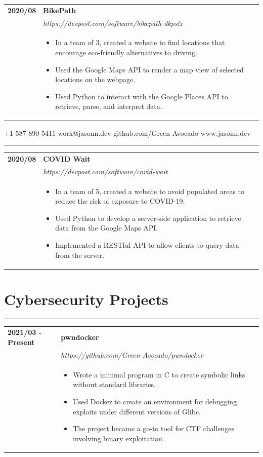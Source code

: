 \documentclass[letterpaper]{article}
\makeatletter
\newcommand{\sect}[1]{\section*{#1}
                        {\color{cyan}
                        \rule{\textwidth}{1pt}
                        \vspace{-1ex}}}
\newcommand{\secondpage}{\pagebreak
                            {\small
                                +1 587-890-5411
                                \hfill
                                work@jasonn.dev
                                \hfill
                                github.com/Green-Avocado
                                \hfill
                                www.jasonn.dev
                            }
                            \vspace{-4pt}

                            \rule{\textwidth}{0.1pt}

                            \vspace{0.2in}}
\makeatother
\begin{document}
        \begin{tabular}{p{} p{}}
            \textbf{2020/08} & \textbf{BikePath} \\
            & \emph{https://devpost.com/software/bikepath-dkpstx} \\
            & \begin{itemize}
                \item In a team of 3, created a website to find locations that encourage eco-friendly
                    alternatives to driving.
                \item Used the Google Maps API to render a map view of selected locations on the webpage.
                \item Used Python to interact with the Google Places API to retrieve, parse, and
                    interpret data.
            \end{itemize}
        \end{tabular}

    \secondpage

        \begin{tabular}{p{} p{}}
            \textbf{2020/08} & \textbf{COVID Wait} \\
            & \emph{https://devpost.com/software/covid-wait} \\
            & \begin{itemize}
                \item In a team of 5, created a website to avoid populated areas to reduce the risk of
                    exposure to COVID-19.
                \item Used Python to develop a server-side application to retrieve data from the Google
                    Maps API.
                \item Implemented a RESTful API to allow clients to query data from the server.
            \end{itemize}
        \end{tabular}

    \sect{Cybersecurity Projects}

        \begin{tabular}{p{} p{}}
            \textbf{2021/03 - Present} & \textbf{pwndocker} \\
            & \emph{https://github.com/Green-Avocado/pwndocker} \\
            & \begin{itemize}
                \item Wrote a minimal program in C to create symbolic links without standard libraries.
                \item Used Docker to create an environment for debugging exploits under different
                    versions of Glibc.
                \item The project became a go-to tool for CTF challenges involving binary exploitation.
            \end{itemize}
        \end{tabular}
\end{document}
